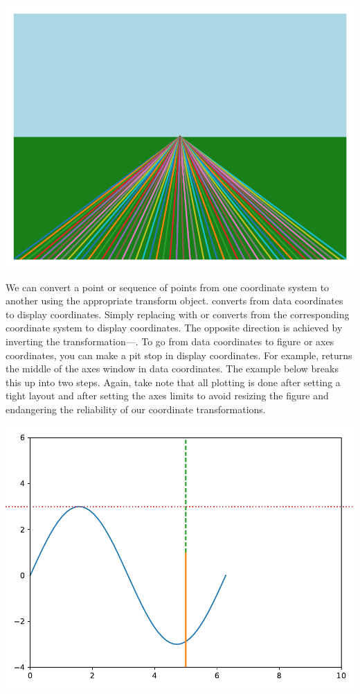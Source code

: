 
\begin{center}
    \includegraphics[width = .7\textwidth]{figures/proseplots/coord-horizon.pdf}
\end{center}


We can convert a point or sequence of points from one coordinate system to another using the appropriate transform object.  converts  from data coordinates to display coordinates. Simply replacing  with  or  converts from the corresponding coordinate system to display coordinates. The opposite direction is achieved by inverting the transformation---. To go from data coordinates to figure or axes coordinates, you can make a pit stop in display coordinates. For example,   returns the middle of the axes window in data coordinates. The example below breaks this up into two steps. Again, take note that all plotting is done after setting a tight layout and after setting the axes limits to avoid resizing the figure and endangering the reliability of our coordinate transformations. 



\begin{center}
    \includegraphics[width = .7\textwidth]{figures/proseplots/coord-trans.pdf}
\end{center}

